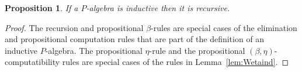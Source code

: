 \documentclass[reqno,10pt,a4paper,oneside]{amsart}
\numberwithin{equation}{section}
\theoremstyle{mythm}
\newtheorem{proposition}[theorem]{Proposition}
\theoremstyle{mydef}
\theoremstyle{myrmk}
\newcommand{\lam}[1]{\lambda_{#1}}
\newcommand{\W}{\mathsf{W}}
\newcommand{\wsup}{\mathsf{sup}}
\newcommand{\wrec}{\mathsf{wrec}}
\newcommand{\UU}{\mathsf{U}}
\begin{document}
\begin{proposition} \label{thm:Windrec}
If a $P$-algebra is inductive then it is recursive.
\end{proposition}


\begin{proof} The recursion and propositional $\beta$-rules are special cases of the elimination and propositional computation rules that are part of the definition of an inductive $P$-algebra. The propositional $\eta$-rule and the
propositional $(\beta, \eta)$-computatibility rules are special cases of the rules in Lemma~\ref{lem:Wetaind}. 
\end{proof}



%
%
\end{document}
